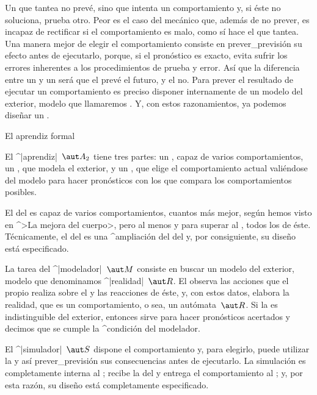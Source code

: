 Un {\gobernador} que tantea no prevé, sino que intenta un comportamiento
y, si éste no soluciona, prueba otro. Peor es el caso del {\gobernador}
mecánico que, además de no prever, es incapaz de rectificar si el
comportamiento es malo, como sí hace el que tantea. Una manera mejor de
elegir el comportamiento consiste en prever_{previsión} su efecto antes
de ejecutarlo, porque, si el pronóstico es exacto, evita sufrir los
errores inherentes a los procedimientos de prueba y error. Así que la
diferencia entre un {\aprendiz} y un {\adaptador} será que el
{\aprendiz} prevé el futuro, y el {\adaptador} no. Para prever el
resultado de ejecutar un comportamiento es preciso disponer internamente
de un modelo del exterior, modelo que llamaremos {\realidad}. Y, con
estos razonamientos, ya podemos diseñar un {\aprendiz}.


\Section El aprendiz formal

El ^|aprendiz|~$\aut A_2$ tiene tres partes: un {\cuerpo}, capaz de
varios comportamientos, un {\modelador}, que modela el exterior, y un
{\simulador}, que elige el comportamiento actual valiéndose del modelo
para hacer pronósticos con los que compara los comportamientos posibles.

\point El {\cuerpo} del {\aprendiz} es capaz de varios comportamientos,
cuantos más mejor, según hemos visto en ^>La mejora del cuerpo>, pero al
menos y para superar al {\adaptador}, todos los de éste. Técnicamente,
el {\cuerpo} del {\aprendiz} es una ^{ampliación} del {\cuerpo} del
{\adaptador} y, por consiguiente, su diseño está especificado.

\point La tarea del ^|modelador|~$\aut M$ consiste en buscar un modelo
del {\universo} exterior, modelo que denominamos ^|realidad|~$\aut R$.
El {\modelador} observa las acciones que el propio {\aprendiz} realiza
sobre el {\universo} y las reacciones de éste, y, con estos datos,
elabora la realidad, que es un comportamiento, o sea, un autómata~$\aut
R$. Si la {\realidad} es indistinguible del {\universo} exterior,
entonces sirve para hacer pronósticos acertados y decimos que se cumple
la ^{condición del modelador}.

\point El ^|simulador|~$\aut S$ dispone el comportamiento y, para
elegirlo, puede utilizar la {\realidad} y así prever_{previsión} sus
consecuencias antes de ejecutarlo. La simulación es completamente
interna al {\aprendiz}; recibe la {\realidad} del {\modelador} y entrega
el comportamiento al {\cuerpo}; y, por esta razón, su diseño está
completamente especificado.

